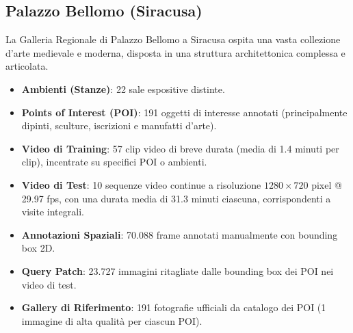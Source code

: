 \documentclass[a4paper,12pt]{report}
\begin{document}
\subsection{Palazzo Bellomo (Siracusa)}
La Galleria Regionale di Palazzo Bellomo a Siracusa ospita una vasta collezione d'arte medievale e moderna, disposta in una struttura architettonica complessa e articolata.
\begin{itemize}
    \item \textbf{Ambienti (Stanze)}: 22 sale espositive distinte.
    \item \textbf{Points of Interest (POI)}: 191 oggetti di interesse annotati (principalmente dipinti, sculture, iscrizioni e manufatti d'arte).
    \item \textbf{Video di Training}: 57 clip video di breve durata (media di 1.4 minuti per clip), incentrate su specifici POI o ambienti.
    \item \textbf{Video di Test}: 10 sequenze video continue a risoluzione $1280 \times 720$ pixel @ 29.97 fps, con una durata media di 31.3 minuti ciascuna, corrispondenti a visite integrali.
    \item \textbf{Annotazioni Spaziali}: 70.088 frame annotati manualmente con bounding box 2D.
    \item \textbf{Query Patch}: 23.727 immagini ritagliate dalle bounding box dei POI nei video di test.
    \item \textbf{Gallery di Riferimento}: 191 fotografie ufficiali da catalogo dei POI (1 immagine di alta qualità per ciascun POI).
\end{itemize}
\end{document}
